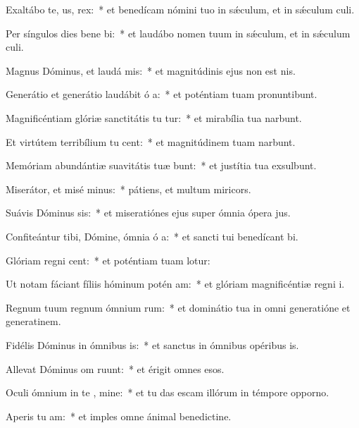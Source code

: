 \item Exaltábo te,  us, rex:~* et benedícam nómini tuo in sǽculum, et in sǽculum culi.
\item Per síngulos dies bene bi:~* et laudábo nomen tuum in sǽculum, et in sǽculum culi.
\item Magnus Dóminus, et laudá mis:~* et magnitúdinis ejus non est nis.
\item Generátio et generátio laudábit ó a:~* et poténtiam tuam pronuntibunt.
\item Magnificéntiam glóriæ sanctitátis tu tur:~* et mirabília tua narbunt.
\item Et virtútem terribílium tu cent:~* et magnitúdinem tuam narbunt.
\item Memóriam abundántiæ suavitátis tuæ bunt:~* et justítia tua exsulbunt.
\item Miserátor, et misé minus:~* pátiens, et multum miricors.
\item Suávis Dóminus sis:~* et miseratiónes ejus super ómnia ópera jus.
\item Confiteántur tibi, Dómine, ómnia ó a:~* et sancti tui benedícant bi.
\item Glóriam regni  cent:~* et poténtiam tuam lotur:
\item Ut notam fáciant fíliis hóminum potén am:~* et glóriam magnificéntiæ regni i.
\item Regnum tuum regnum ómnium rum:~* et dominátio tua in omni generatióne et generatinem.
\item Fidélis Dóminus in ómnibus  is:~* et sanctus in ómnibus opéribus is.
\item Allevat Dóminus om  ruunt:~* et érigit omnes esos.
\item Oculi ómnium in te , mine:~* et tu das escam illórum in témpore opporno.
\item Aperis tu  am:~* et imples omne ánimal benedictine.
